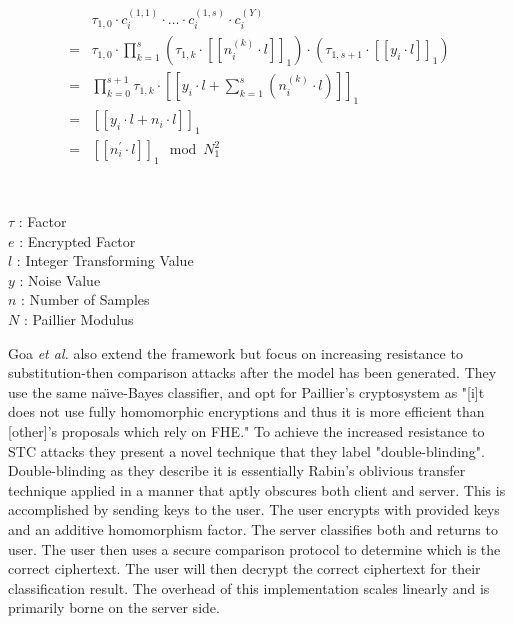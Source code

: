\documentclass[]{article}
\begin{document}
\begingroup
\begin{framed}
	\vspace{-3em}	
\begin{multicols}{2}%
	\begin{align*}
		& \tau_{1,0} \cdot c^{(1,1)}_i \cdot \ldots \cdot c^{(1,s)}_i \cdot c^{(Y)}_i \\
	= 	& \tau_{1,0} \cdot \prod_{k=1}^{s} \left( \tau_{1,k} \cdot
			\left[\left[ n^{(k)}_i \cdot l \right]\right]_1\right) \cdot
			\left( \tau_{1,s+1} \cdot \left[\left[ y_i \cdot l \right]\right]_1\right) \\
	= 	& \prod_{k=0}^{s+1} \tau_{1,k} \cdot \left[\left[ y_i \cdot l 
			+ \sum_{ k=1}^{s}(n^{(k)}_i \cdot l) \right]\right]_1 \\
	= 	& \left[\left[ y_i \cdot l + n_i \cdot l \right]\right]_1  \\
	= 	& \left[\left[ n^{\prime}_i \cdot l \right]\right]_1 
			\mod N^2_1 \\
	\end{align*}
	\vfill\eject 		
	\vphantom{x} \\
	\vspace{6em} \\
	$\tau$ : Factor \\
	$e$ : Encrypted Factor\\
	$l$ : Integer Transforming Value\\
	$y$ : Noise Value\\
	$n$ : Number of Samples\\
	$N$ : Paillier Modulus\\
\end{multicols}
\vspace{-2em}
\end{framed}
\vspace{-1.25em}
\vspace{1.5em}
\endgroup

Goa \emph{et al.} \cite{Gao2018} also extend the \cite{Bost2015} framework but focus on increasing resistance to substitution-then comparison attacks after the model has been generated.
They use the same na\"{\i}ve-Bayes classifier, and opt for Paillier's cryptosystem as 
"[i]t does not use fully homomorphic encryptions and thus it is more efficient than [other]’s proposals which rely on FHE." \cite[p. 3]{Gao2018}
To achieve the increased resistance to STC attacks they present a novel technique that they label "double-blinding".
Double-blinding as they describe it is essentially Rabin's oblivious transfer technique \cite{Rabin1981}
applied in a manner that aptly obscures both client and server.
This is accomplished by sending keys to the user.
The user encrypts with provided keys and an additive homomorphism factor.
The server classifies both and returns to user.
The user then uses a secure comparison protocol to determine which is the correct ciphertext.
The user will then decrypt the correct ciphertext for their classification result.
The overhead of this implementation scales linearly and is primarily borne on the server side.
\end{document}
